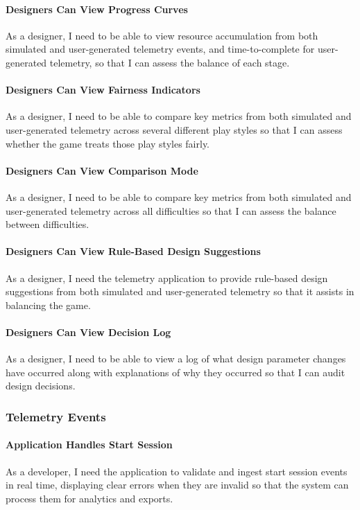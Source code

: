 \paragraph{Designers Can View Progress Curves}
As a designer, I need to be able to view resource accumulation from both simulated and user-generated telemetry events, and time-to-complete for user-generated telemetry, so that I can assess the balance of each stage.

\paragraph{Designers Can View Fairness Indicators}
As a designer, I need to be able to compare key metrics from both simulated and user-generated telemetry across several different play styles so that I can assess whether the game treats those play styles fairly.

\paragraph{Designers Can View Comparison Mode}
As a designer, I need to be able to compare key metrics from both simulated and user-generated telemetry across all difficulties so that I can assess the balance between difficulties.

\paragraph{Designers Can View Rule-Based Design Suggestions}
As a designer, I need the telemetry application to provide rule-based design suggestions from both simulated and user-generated telemetry so that it assists in balancing the game.

\paragraph{Designers Can View Decision Log}
As a designer, I need to be able to view a log of what design parameter changes have occurred along with explanations of why they occurred so that I can audit design decisions.

\subsubsection{Telemetry Events}

\paragraph{Application Handles Start Session}
As a developer, I need the application to validate and ingest start session events in real time, displaying clear errors when they are invalid so that the system can process them for analytics and exports.

